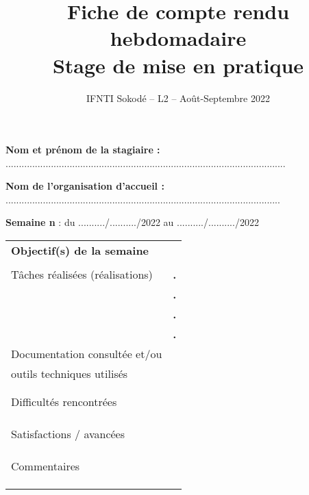 \documentclass[a4paper,11pt]{article}
\title{\vspace{-2cm}Fiche de compte rendu hebdomadaire\\\vspace{.1cm}\Large Stage de mise en pratique}
\date{\vspace{-1cm}IFNTI Sokodé -- L2 -- Août-Septembre 2022}
\makeatletter
\newcommand{\mktitle}{\@maketitle}
\makeatother
\begin{document}
\mktitle\vspace{-.2cm}

\noindent\textbf{Nom et prénom de la stagiaire :} .........................................................................................................\vspace{.4cm}

\noindent\textbf{Nom de l'organisation d'accueil :} .......................................................................................................\vspace{.4cm}

\noindent\textbf{Semaine n} : du ........../........../2022 au ........../........../2022\vspace{-.2cm}

\begin{center}
\begin{tabular}{|C{6cm}|p{10.3cm}|}
	\hline
	\textbf{Objectif(s) de la semaine} &\\&\\
	\hline
	Tâches réalisées (réalisations) & \hspace{.2cm}\huge\textbf{.}\\&\hspace{.2cm}\huge\textbf{.}\\&\hspace{.2cm}\huge\textbf{.}\\& \hspace{.2cm}\huge\textbf{.}\\
	\hline
	Documentation consultée et/ou &\\
	outils techniques utilisés &\\&\\&\\
	\hline
	Difficultés rencontrées &\\&\\&\\&\\
	\hline
	Satisfactions / avancées &\\&\\&\\&\\
	\hline
	Commentaires &\\&\\&\\&\\
	\hline
\end{tabular}\vspace{.35cm}
\begin{tabular}{|C{6cm}|p{10.3cm}|}

\end{tabular}
\end{center}
\end{document}
